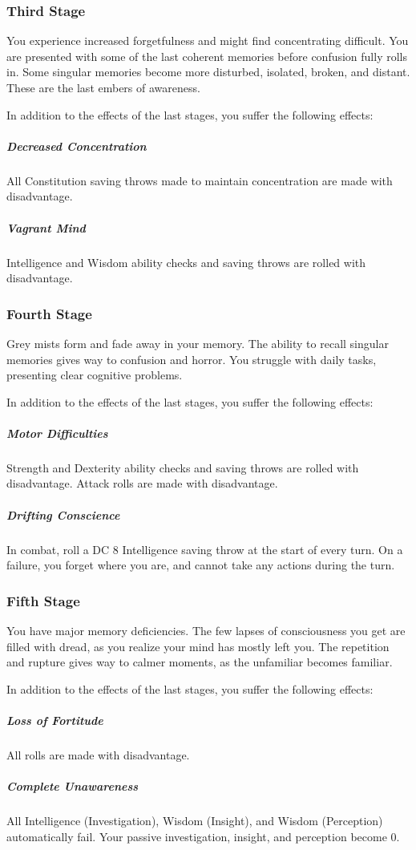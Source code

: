 \subsubsection{Third Stage}
    You experience increased forgetfulness and might find concentrating difficult.
    You are presented with some of the last coherent memories before confusion fully rolls in.
    Some singular memories become more disturbed, isolated, broken, and distant.
    These are the last embers of awareness.

    In addition to the effects of the last stages, you suffer the following effects:
    \subparagraph{Decreased Concentration} All Constitution saving throws made to maintain concentration are made with disadvantage.
    \subparagraph{Vagrant Mind} Intelligence and Wisdom ability checks and saving throws are rolled with disadvantage.

\subsubsection{Fourth Stage}
    Grey mists form and fade away in your memory.
    The ability to recall singular memories gives way to confusion and horror.
    You struggle with daily tasks, presenting clear cognitive problems.

    In addition to the effects of the last stages, you suffer the following effects:
    \subparagraph{Motor Difficulties} Strength and Dexterity ability checks and saving throws are rolled with disadvantage.
    Attack rolls are made with disadvantage.
    \subparagraph{Drifting Conscience} In combat, roll a DC 8 Intelligence saving throw at the start of every turn.
    On a failure, you forget where you are, and cannot take any actions during the turn.

\subsubsection{Fifth Stage}
    You have major memory deficiencies.
    The few lapses of consciousness you get are filled with dread, as you realize your mind has mostly left you.
    The repetition and rupture gives way to calmer moments, as the unfamiliar becomes familiar.

    In addition to the effects of the last stages, you suffer the following effects:
    \subparagraph{Loss of Fortitude} All rolls are made with disadvantage.
    \subparagraph{Complete Unawareness} All Intelligence (Investigation), Wisdom (Insight), and Wisdom (Perception) automatically fail.
    Your passive investigation, insight, and perception become 0.


